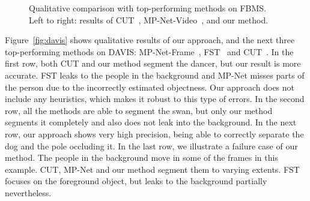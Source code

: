 \documentclass[10pt,twocolumn,letterpaper]{article}
\begin{document}
\begin{figure}[t]
\begin{center}
\vspace{0.1cm}
\vspace{0.1cm}
\end{center}
\vspace{-0.3cm}\caption{Qualitative comparison with top-performing methods on
FBMS. Left to right: results of CUT~\cite{keuper2015motion},
MP-Net-Video~\cite{papazoglou2013fast}, and our method.}
\vspace{-0.4cm}
\label{fig:fbms}
\end{figure}
Figure~\ref{fig:davis} shows qualitative results of our approach, and the next
three top-performing methods on DAVIS:
MP-Net-Frame~\cite{tokmakov2016learning}, FST~\cite{papazoglou2013fast} and
CUT~\cite{keuper2015motion}. In the first row, both CUT and our method segment
the dancer, but our result is more accurate. FST leaks to the people in the
background and MP-Net misses parts of the person due to the incorrectly
estimated objectness. Our approach does not include any heuristics, which
makes it robust to this type of errors. In the second row, all the methods are
able to segment the swan, but only our method segments it completely and also
does not leak into the background. In the next row, our approach shows very
high precision, being able to correctly separate the dog and the pole occluding
it. In the last row, we illustrate a failure case of our method. The people in
the background move in some of the frames in this example. CUT, MP-Net and our
method segment them to varying extents. FST focuses on the foreground object,
but leaks to the background partially nevertheless.
\end{document}

